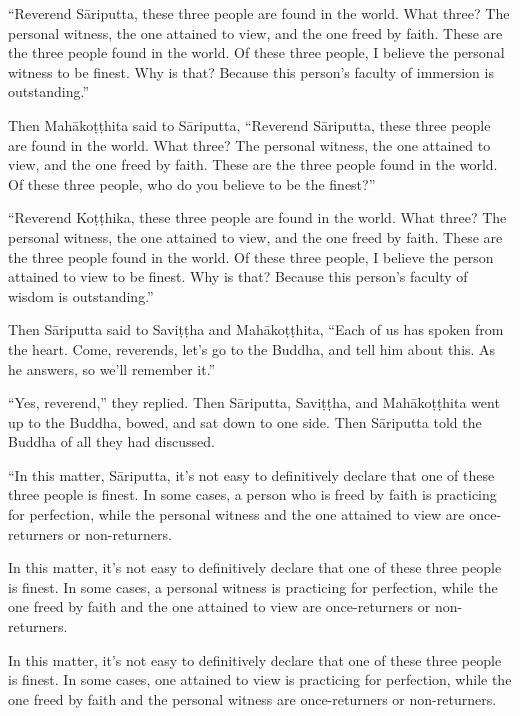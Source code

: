 \documentclass[12pt,openany]{book}%
\begin{document}
“Reverend \textsanskrit{Sāriputta}, these three people are found in the world. What three? The personal witness, the one attained to view, and the one freed by faith. These are the three people found in the world. Of these three people, I believe the personal witness to be finest. Why is that? Because this person’s faculty of immersion is outstanding.” 

Then \textsanskrit{Mahākoṭṭhita} said to \textsanskrit{Sāriputta}, “Reverend \textsanskrit{Sāriputta}, these three people are found in the world. What three? The personal witness, the one attained to view, and the one freed by faith. These are the three people found in the world. Of these three people, who do you believe to be the finest?” 

“Reverend \textsanskrit{Koṭṭhika}, these three people are found in the world. What three? The personal witness, the one attained to view, and the one freed by faith. These are the three people found in the world. Of these three people, I believe the person attained to view to be finest. Why is that? Because this person’s faculty of wisdom is outstanding.” 

Then \textsanskrit{Sāriputta} said to \textsanskrit{Saviṭṭha} and \textsanskrit{Mahākoṭṭhita}, “Each of us has spoken from the heart. Come, reverends, let’s go to the Buddha, and tell him about this. As he answers, so we’ll remember it.” 

“Yes, reverend,” they replied. Then \textsanskrit{Sāriputta}, \textsanskrit{Saviṭṭha}, and \textsanskrit{Mahākoṭṭhita} went up to the Buddha, bowed, and sat down to one side. Then \textsanskrit{Sāriputta} told the Buddha of all they had discussed. 

“In this matter, \textsanskrit{Sāriputta}, it’s not easy to definitively declare that one of these three people is finest. In some cases, a person who is freed by faith is practicing for perfection, while the personal witness and the one attained to view are once-returners or non-returners. 

In this matter, it’s not easy to definitively declare that one of these three people is finest. In some cases, a personal witness is practicing for perfection, while the one freed by faith and the one attained to view are once-returners or non-returners. 

In this matter, it’s not easy to definitively declare that one of these three people is finest. In some cases, one attained to view is practicing for perfection, while the one freed by faith and the personal witness are once-returners or non-returners. 
\end{document}
